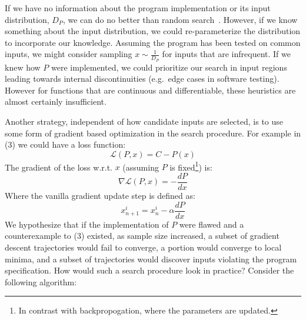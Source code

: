 \documentclass[12pt,initial,twoside,maitrise]{dms}
\numberwithin{equation}{section}
\numberwithin{table}{chapter}
\numberwithin{figure}{chapter}
\begin{document}
If we have no information about the program implementation or its input distribution, $D_P$, we can do no better than random search~\cite{wolpert1997no}. However, if we know something about the input distribution, we could re-parameterize the distribution to incorporate our knowledge. Assuming the program has been tested on common inputs, we might consider sampling $x \sim \frac{1}{D_P}$ for inputs that are infrequent. If we knew how $P$ were implemented, we could prioritize our search in input regions leading towards internal discontinuities (e.g.\ edge cases in software testing). However for functions that are continuous and differentiable, these heuristics are almost certainly insufficient.


Another strategy, independent of how candidate inputs are selected, is to use some form of gradient based optimization in the search procedure. For example in (3) we could have a loss function:
%
\begin{equation}
    \mathcal{L}(P, x) = C - P(x)
\end{equation}
%
The gradient of the loss w.r.t. $x$ (assuming $P$ is fixed\footnote{In contrast with backpropogation, where the parameters are updated.}) is:
%
\begin{equation}
    \nabla \mathcal{L}(P, x) = - \frac{dP}{dx}
\end{equation}
%
Where the vanilla gradient update step is defined as:
%
\begin{equation}
    x_{n+1}^i=x_{n}^i - \alpha\frac{dP}{dx}
\end{equation}
%
We hypothesize that if the implementation of $P$ were flawed and a counterexample to (3) existed, as sample size increased, a subset of gradient descent trajectories would fail to converge, a portion would converge to local minima, and a subset of trajectories would discover inputs violating the program specification. How would such a search procedure look in practice? Consider the following algorithm:

%
%
\end{document}
